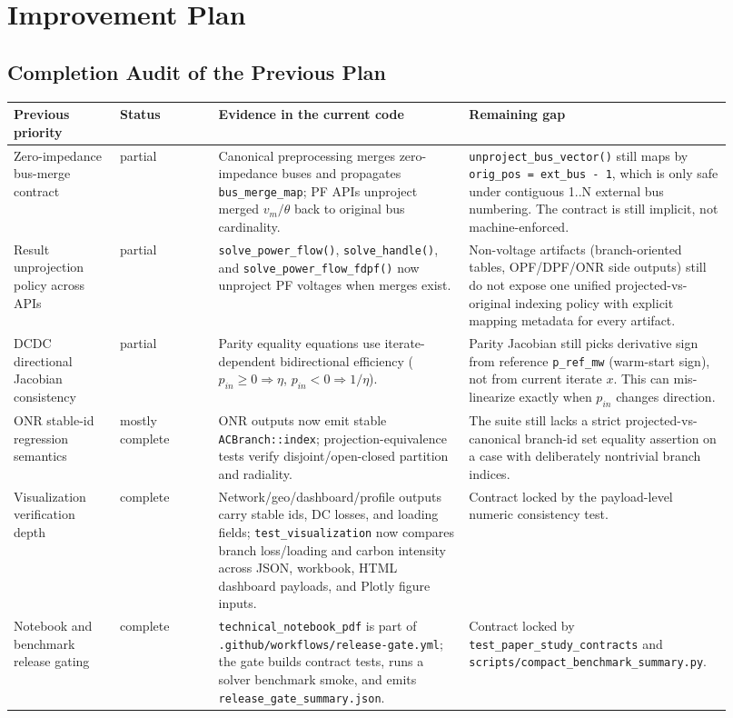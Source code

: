 \section{Improvement Plan}

\subsection{Completion Audit of the Previous Plan}

\begin{longtable}{@{}L{0.14\linewidth}L{0.13\linewidth}L{0.33\linewidth}L{0.32\linewidth}@{}}
\toprule
Previous priority & Status & Evidence in the current code & Remaining gap \\
\midrule
\endhead
Zero-impedance bus-merge contract & partial & Canonical preprocessing merges zero-impedance buses and propagates \texttt{bus\_merge\_map}; PF APIs unproject merged \(v_m/\theta\) back to original bus cardinality. & \texttt{unproject\_bus\_vector()} still maps by \texttt{orig\_pos = ext\_bus - 1}, which is only safe under contiguous 1..N external bus numbering. The contract is still implicit, not machine-enforced. \\
Result unprojection policy across APIs & partial & \texttt{solve\_power\_flow()}, \texttt{solve\_handle()}, and \texttt{solve\_power\_flow\_fdpf()} now unproject PF voltages when merges exist. & Non-voltage artifacts (branch-oriented tables, OPF/DPF/ONR side outputs) still do not expose one unified projected-vs-original indexing policy with explicit mapping metadata for every artifact. \\
DCDC directional Jacobian consistency & partial & Parity equality equations use iterate-dependent bidirectional efficiency (\(p_{in}\ge0 \Rightarrow \eta\), \(p_{in}<0 \Rightarrow 1/\eta\)). & Parity Jacobian still picks derivative sign from reference \texttt{p\_ref\_mw} (warm-start sign), not from current iterate \(x\). This can mis-linearize exactly when \(p_{in}\) changes direction. \\
ONR stable-id regression semantics & mostly complete & ONR outputs now emit stable \texttt{ACBranch::index}; projection-equivalence tests verify disjoint/open-closed partition and radiality. & The suite still lacks a strict projected-vs-canonical branch-id set equality assertion on a case with deliberately nontrivial branch indices. \\
Visualization verification depth & complete & Network/geo/dashboard/profile outputs carry stable ids, DC losses, and loading fields; \texttt{test\_visualization} now compares branch loss/loading and carbon intensity across JSON, workbook, HTML dashboard payloads, and Plotly figure inputs. & Contract locked by the payload-level numeric consistency test. \\
Notebook and benchmark release gating & complete & \texttt{technical\_notebook\_pdf} is part of \texttt{.github/workflows/release-gate.yml}; the gate builds contract tests, runs a solver benchmark smoke, and emits \texttt{release\_gate\_summary.json}. & Contract locked by \texttt{test\_paper\_study\_contracts} and \texttt{scripts/compact\_benchmark\_summary.py}. \\
\bottomrule
\end{longtable}

